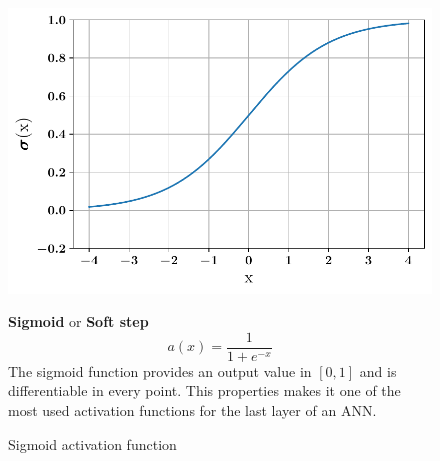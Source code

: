 \begin{figure}[!h]
\begin{minipage}{0.45\textwidth}

    \centering
\includegraphics[width=\textwidth]{images/networks/act_sig.pdf}
\caption{Sigmoid activation function}
    \label{fig:act_sig}
\end{minipage}
\hfill
\begin{minipage}{0.5\textwidth}
    \textbf{Sigmoid} or \textbf{Soft step}
   \begin{equation}
       a(x) =\frac{1}{1+e^{-x}}
   \end{equation}
   The sigmoid function provides an output value in $[0,1]$ and is differentiable in every point. This properties makes it one of the most used activation functions for the last layer of an ANN.
\end{minipage}
    \end{figure}


